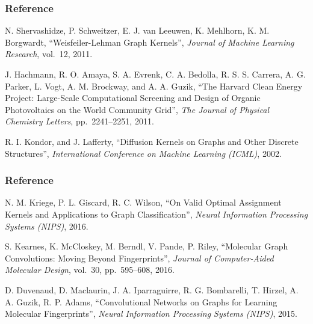 \documentclass{beamer}
\begin{document}
\begin{frame}
\frametitle{Reference}
\begin{justify}
\begin{thebibliography}{9}

   N. Shervashidze, P. Schweitzer, E. J. van Leeuwen, K. Mehlhorn, K. M. Borgwardt,
   ``Weisfeiler-Lehman Graph Kernels'',
   \textit{Journal of Machine Learning Research}, vol.~12, 2011.
   
   J. Hachmann, R. O. Amaya, S. A. Evrenk, C. A. Bedolla, R. S. S. Carrera, A. G. Parker, L. Vogt, A. M. Brockway, and A. A. Guzik,
   ``The Harvard Clean Energy Project: Large-Scale Computational Screening and Design of Organic Photovoltaics on the World Community Grid'',
   \textit{The Journal of Physical Chemistry Letters}, pp.~2241--2251, 2011.

   R. I. Kondor, and J. Lafferty,
   ``Diffusion Kernels on Graphs and Other Discrete Structures'',
   \textit{International Conference on Machine Learning (ICML)}, 2002.
   
\end{thebibliography}
\end{justify}
\end{frame}

\begin{frame}
\frametitle{Reference}
\begin{justify}
\begin{thebibliography}{9}

   N. M. Kriege, P. L. Giscard, R. C. Wilson,
   ``On Valid Optimal Assignment Kernels and Applications to Graph Classification'',
   \textit{Neural Information Processing Systems (NIPS)}, 2016.

   S. Kearnes, K. McCloskey, M. Berndl, V. Pande, P. Riley,
   ``Molecular Graph Convolutions: Moving Beyond Fingerprints'',
   \textit{Journal of Computer-Aided Molecular Design}, vol.~30, pp.~595--608, 2016.

   D. Duvenaud, D. Maclaurin, J. A. Iparraguirre, R. G. Bombarelli, T. Hirzel, A. A. Guzik, R. P. Adams,
   ``Convolutional Networks on Graphs for Learning Molecular Fingerprints'',
   \textit{Neural Information Processing Systems (NIPS)}, 2015.
  
\end{thebibliography}
\end{justify}
\end{frame}
\end{document}
